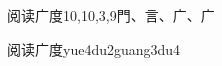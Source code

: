 \begin{entry}{阅读广度}{10,10,3,9}{⾨、⾔、⼴、⼴}
  \begin{phonetics}{阅读广度}{yue4du2guang3du4}
  \end{phonetics}
\end{entry}
